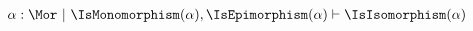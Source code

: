 \begin{sequent}
\begin{align*}
  \alpha: \Mor ~|~ \IsMonomorphism( \alpha ), \IsEpimorphism( \alpha ) \vdash \IsIsomorphism( \alpha )
\end{align*}
\end{sequent}